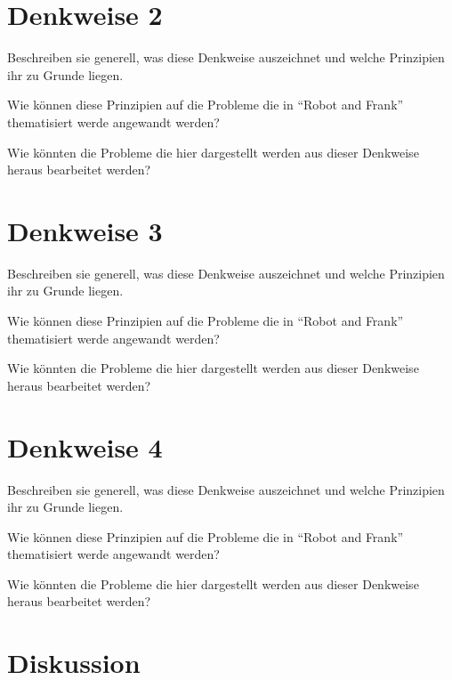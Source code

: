 \documentclass[sigchi-a, authorversion]{acmart}
\begin{document}
\section{Denkweise 2}

Beschreiben sie generell, was diese Denkweise auszeichnet und welche Prinzipien ihr zu Grunde liegen.

Wie können diese Prinzipien auf die Probleme die in ``Robot and Frank'' thematisiert werde angewandt werden?

Wie könnten die Probleme die hier dargestellt werden aus dieser Denkweise heraus bearbeitet werden?

\section{Denkweise 3}

Beschreiben sie generell, was diese Denkweise auszeichnet und welche Prinzipien ihr zu Grunde liegen.

Wie können diese Prinzipien auf die Probleme die in ``Robot and Frank'' thematisiert werde angewandt werden?

Wie könnten die Probleme die hier dargestellt werden aus dieser Denkweise heraus bearbeitet werden?

\section{Denkweise 4}

Beschreiben sie generell, was diese Denkweise auszeichnet und welche Prinzipien ihr zu Grunde liegen.

Wie können diese Prinzipien auf die Probleme die in ``Robot and Frank'' thematisiert werde angewandt werden?

Wie könnten die Probleme die hier dargestellt werden aus dieser Denkweise heraus bearbeitet werden?


\section{Diskussion}
\end{document}
